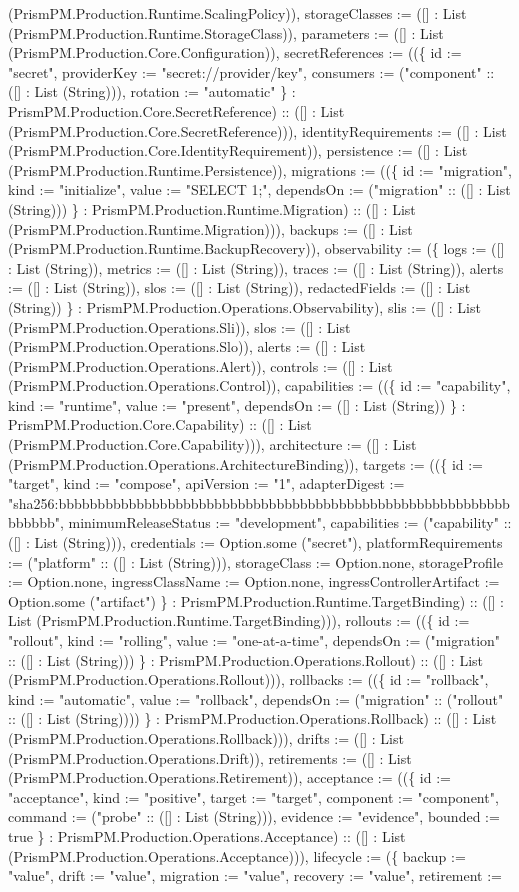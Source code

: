\documentclass[11pt]{article}
\begin{document}
(PrismPM.Production.Runtime.ScalingPolicy)), storageClasses := ([] : List (PrismPM.Production.Runtime.StorageClass)), parameters := ([] : List (PrismPM.Production.Core.Configuration)), secretReferences := ((\{ id := "secret", providerKey := "secret://provider/key", consumers := ("component" :: ([] : List (String))), rotation := "automatic" \} : PrismPM.Production.Core.SecretReference) :: ([] : List (PrismPM.Production.Core.SecretReference))), identityRequirements := ([] : List (PrismPM.Production.Core.IdentityRequirement)), persistence := ([] : List (PrismPM.Production.Runtime.Persistence)), migrations := ((\{ id := "migration", kind := "initialize", value := "SELECT 1;", dependsOn := ("migration" :: ([] : List (String))) \} : PrismPM.Production.Runtime.Migration) :: ([] : List (PrismPM.Production.Runtime.Migration))), backups := ([] : List (PrismPM.Production.Runtime.BackupRecovery)), observability := (\{ logs := ([] : List (String)), metrics := ([] : List (String)), traces := ([] : List (String)), alerts := ([] : List (String)), slos := ([] : List (String)), redactedFields := ([] : List (String)) \} : PrismPM.Production.Operations.Observability), slis := ([] : List (PrismPM.Production.Operations.Sli)), slos := ([] : List (PrismPM.Production.Operations.Slo)), alerts := ([] : List (PrismPM.Production.Operations.Alert)), controls := ([] : List (PrismPM.Production.Operations.Control)), capabilities := ((\{ id := "capability", kind := "runtime", value := "present", dependsOn := ([] : List (String)) \} : PrismPM.Production.Core.Capability) :: ([] : List (PrismPM.Production.Core.Capability))), architecture := ([] : List (PrismPM.Production.Operations.ArchitectureBinding)), targets := ((\{ id := "target", kind := "compose", apiVersion := "1", adapterDigest := "sha256:bbbbbbbbbbbbbbbbbbbbbbbbbbbbbbbbbbbbbbbbbbbbbbbbbbbbbbbbbbbbbbbb", minimumReleaseStatus := "development", capabilities := ("capability" :: ([] : List (String))), credentials := Option.some ("secret"), platformRequirements := ("platform" :: ([] : List (String))), storageClass := Option.none, storageProfile := Option.none, ingressClassName := Option.none, ingressControllerArtifact := Option.some ("artifact") \} : PrismPM.Production.Runtime.TargetBinding) :: ([] : List (PrismPM.Production.Runtime.TargetBinding))), rollouts := ((\{ id := "rollout", kind := "rolling", value := "one-at-a-time", dependsOn := ("migration" :: ([] : List (String))) \} : PrismPM.Production.Operations.Rollout) :: ([] : List (PrismPM.Production.Operations.Rollout))), rollbacks := ((\{ id := "rollback", kind := "automatic", value := "rollback", dependsOn := ("migration" :: ("rollout" :: ([] : List (String)))) \} : PrismPM.Production.Operations.Rollback) :: ([] : List (PrismPM.Production.Operations.Rollback))), drifts := ([] : List (PrismPM.Production.Operations.Drift)), retirements := ([] : List (PrismPM.Production.Operations.Retirement)), acceptance := ((\{ id := "acceptance", kind := "positive", target := "target", component := "component", command := ("probe" :: ([] : List (String))), evidence := "evidence", bounded := true \} : PrismPM.Production.Operations.Acceptance) :: ([] : List (PrismPM.Production.Operations.Acceptance))), lifecycle := (\{ backup := "value", drift := "value", migration := "value", recovery := "value", retirement := 
\end{document}
